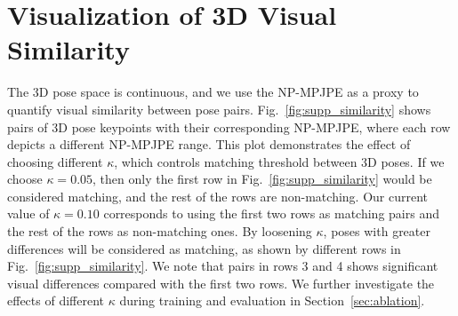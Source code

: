 \section{Visualization of 3D Visual Similarity}\label{sec:3d_visual_similarity}

The 3D pose space is continuous, and we use the NP-MPJPE as a proxy to quantify visual similarity between pose pairs. Fig.~\ref{fig:supp_similarity} shows pairs of 3D pose keypoints with their corresponding NP-MPJPE, where each row depicts a different NP-MPJPE range. This plot demonstrates the effect of choosing different $\kappa$, which controls matching threshold between 3D poses. If we choose $\kappa = 0.05$, then only the first row in Fig.~\ref{fig:supp_similarity} would be considered matching, and the rest of the rows are non-matching. Our current value of $\kappa = 0.10$ corresponds to using the first two rows as matching pairs and the rest of the rows as non-matching ones. By loosening $\kappa$, poses with greater differences will be considered as matching, as shown by different rows in Fig.~\ref{fig:supp_similarity}. We note that pairs in rows 3 and 4 shows significant visual differences compared with the first two rows. We further investigate the effects of different $\kappa$ during training and evaluation in Section~\ref{sec:ablation}.


